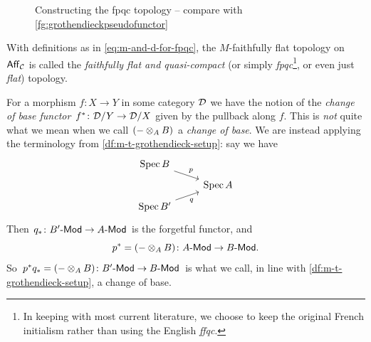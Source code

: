        \begin{figure}[h]
            \centering
            \caption{Constructing the fpqc topology -- compare with \cref{fg:grothendieckpseudofunctor}}
            \label{fg:MfaithfullyflatwithAmod}
        \end{figure}

        \begin{definition}\label{df:fpqc-topology}
            With definitions as in \cref{eq:m-and-d-for-fpqc}, the $M$-faithfully flat topology on $\mathsf{Aff}_{\mathcal{C}}$ is called the \emph{faithfully flat and quasi-compact} (or simply \emph{fpqc}\footnote{
                In keeping with most current literature, we choose to keep the original French initialism rather than using the English \emph{ffqc}.
            }, or even just \emph{flat}) topology.
        \end{definition}

        \begin{note}\label{nt:change-of-base}
            For a morphism $f\colon X\to Y$ in some category $\mathcal{D}$ we have the notion of the \emph{change of base functor $f^*\colon\mathcal{D}/Y\to\mathcal{D}/X$} given by the pullback along $f$.
            This is \emph{not} quite what we mean when we call $({-}\otimes_A B)$ a \emph{change of base}.
            We are instead applying the terminology from \cref{df:m-t-grothendieck-setup}: say we have
            \begin{equation*}
                \begin{tikzcd}[row sep=.5em]
                    \spec B \arrow[dr, "p"] &\\
                    & \spec A\\
                    \spec B' \arrow[ur, swap, "q"] &
                \end{tikzcd}
            \end{equation*}
            Then $q_*\colon{{B'}\hbox{-}\mathsf{Mod}}\to{{A}\hbox{-}\mathsf{Mod}}$ is the forgetful functor, and
            \begin{equation*}
                p^*=({-}\otimes_A B)\colon{{A}\hbox{-}\mathsf{Mod}}\to{{B}\hbox{-}\mathsf{Mod}}.
            \end{equation*}
            So $p^*q_*=({-}\otimes_A B)\colon{{B'}\hbox{-}\mathsf{Mod}}\to{{B}\hbox{-}\mathsf{Mod}}$ is what we call, in line with \cref{df:m-t-grothendieck-setup}, a change of base.
        \end{note}


